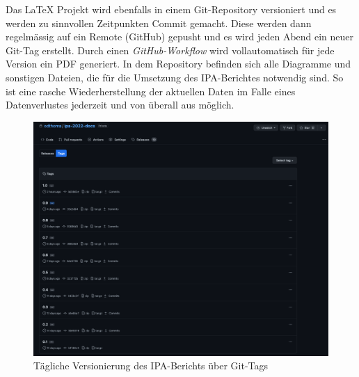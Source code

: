 Das LaTeX Projekt wird ebenfalls in einem Git-Repository versioniert und es werden zu sinnvollen Zeitpunkten Commit gemacht. Diese werden dann regelmässig auf ein Remote (GitHub) gepusht und es wird jeden Abend ein neuer Git-Tag erstellt.
Durch einen \emph{GitHub-Workflow} wird vollautomatisch für jede Version ein PDF generiert.
In dem Repository befinden sich alle Diagramme und sonstigen Dateien, die für die Umsetzung des IPA-Berichtes notwendig sind. 
So ist eine rasche Wiederherstellung der aktuellen Daten im Falle eines Datenverlustes jederzeit und von überall aus möglich.

\begin{figure}[H]
    \centering
    \includegraphics[width=\textwidth]{images/latex-github-tags.png}
    \caption{\label{fig:latex-github-tags}Tägliche Versionierung des IPA-Berichts über Git-Tags}
\end{figure}

